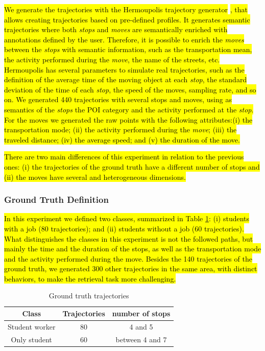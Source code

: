 \documentclass[12pt]{article}
\begin{document}
\hl{We generate the trajectories with the  Hermoupolis trajectory generator} \citep{Pelekis-Hermoupolis}\hl{, that allows creating trajectories based on pre-defined profiles. It generates semantic trajectories where both \emph{stops} and \emph{moves} are semantically enriched with annotations defined by the user. Therefore, it is possible to enrich the \emph{moves} between the \emph{stops} with semantic information, such as the transportation mean, the activity performed during the \emph{move}, the name of the streets, etc. Hermoupolis has several parameters to simulate real trajectories, such as the definition of the average time of the moving object at each \emph{stop}, the standard deviation of the time of each \emph{stop}, the speed of the moves, sampling rate, and so on. We generated 440 trajectories with several stops and moves, using as semantics of the \emph{stops} the POI category and the activity performed at the \emph{stop}. For the moves we generated the raw points with the following attributes:(i) the transportation mode; (ii) the activity performed during the \emph{move}; (iii) the traveled distance; (iv) the average speed; and (v) the duration of the move.}

\hl{There are two main differences of this experiment in relation to the previous ones: (i) the trajectories of the ground truth have a different number of stops and (ii) the moves have several and heterogeneous dimensions.}

\subsubsection{Ground Truth Definition}
\hl{In this experiment we defined two classes, summarized in Table {\ref{tab:hermoupolis_dataset}}: (i) students with a job (80 trajectories); and (ii) students without a job (60 trajectories). What distinguishes the classes in this experiment is not the followed paths, but mainly the time and the duration  of the stops, as well as the transportation mode and the activity performed during the move. Besides the 140 trajectories of the ground truth, we generated 300 other trajectories in the same area, with distinct behaviors, to make the retrieval task more challenging.}

\begin{table}[ht!]
\scriptsize
  \centering
  \begin{tabular}{|c|c|c|}
  	\hline
  Class & Trajectories & number of stops \\
  	\hline
Student worker & 80 & 4 and 5 \\
Only student & 60 & between 4 and 7 \\
    \hline
  \end{tabular}
  \caption{Ground truth trajectories}
  \label{tab:hermoupolis_dataset}
\end{table}
\end{document}

